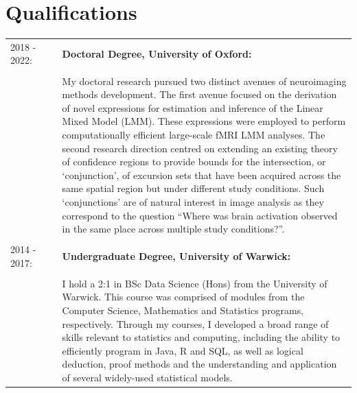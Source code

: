 \documentclass{friggeri-cv}
\begin{document}
\section{Qualifications}

\begin{tabular}{p{0.15\linewidth} p{0.85\linewidth}}
     2018 - 2022: & \textbf{Doctoral Degree, University of Oxford:} \\
     & \\
     & My doctoral research pursued two distinct avenues of neuroimaging methods development. The first avenue focused on the derivation of novel expressions for estimation and inference of the Linear Mixed Model (LMM). These expressions were employed to perform computationally efficient large-scale fMRI LMM analyses. The second research direction centred on extending an existing theory of confidence regions to provide bounds for the intersection, or ‘conjunction’, of excursion sets that have been acquired across the same spatial region but under different study conditions. Such `conjunctions' are of natural interest in image analysis as they correspond to the question ``Where was brain activation observed in the same place across multiple study conditions?''.\\
     & \\
     2014 - 2017: & \textbf{Undergraduate Degree, University of Warwick:}\\
     & \\
     & I hold a 2:1 in BSc Data Science (Hons) from the University of Warwick. This course was comprised of modules from the Computer Science, Mathematics and Statistics programs, respectively. Through my courses, I developed a broad range of skills relevant to statistics and computing, including the ability to efficiently program in Java, R and SQL, as well as logical deduction, proof methods and the understanding and application of several widely-used statistical models.\\
\end{tabular}

 
\end{document}
